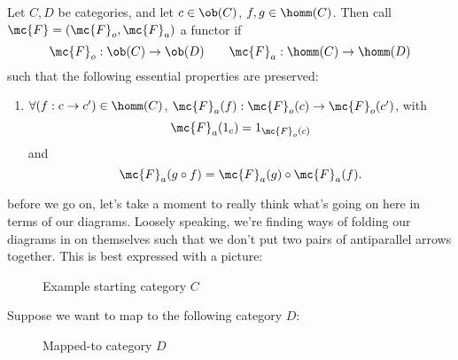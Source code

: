 \begin{definition}[Functor]
  Let $C, D$ be categories, and let $c \in \ob(C)$, $f,g \in
  \homm(C)$. Then call $\mc{F} = (\mc{F}_o, \mc{F}_a)$ a functor if
  \[
    \mc{F}_o : \ob(C) \to \ob(D) \qquad \mc{F}_a : \homm(C) \to
    \homm(D)
  \]
  such that the following essential properties are preserved:
  \begin{enumerate}
    \item $\forall (f : c \to c') \in \homm(C)$, $\mc{F}_a(f) :
      \mc{F}_o(c) \to \mc{F}_o(c')$, with
      \[
        \mc{F}_a(1_{c}) = 1_{\mc{F}_o(c)}
      \]
      and
      \[
        \mc{F}_a(g \circ f) = \mc{F}_a(g) \circ \mc{F}_a(f).
      \]
  \end{enumerate}
\end{definition}
before we go on, let's take a moment to really think what's going on
here in terms of our diagrams. Loosely speaking, we're finding ways of
folding our diagrams in on themselves such that we don't put two pairs
of antiparallel arrows together. This is best expressed with a
picture:
\begin{figure}[H]
  \centering
  \caption{Example starting category $C$}
\end{figure}
Suppose we want to map to the following category $D$:
\begin{figure}[H]
  \centering
  \caption{Mapped-to category $D$}
\end{figure}
